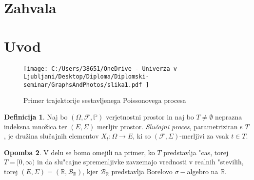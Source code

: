 \documentclass[12pt, a4paper, reqno]{amsart}
\theoremstyle{definition}
\newtheorem{definicija}{Definicija}[section]
\newtheorem{opomba}[definicija]{Opomba}
\theoremstyle{plain}
\newcommand{\R}{\mathbb{R}}
\newcommand{\B}{\mathcal{B}}
\newcommand{\1}{\mathds{1}}
\begin{document}
\section*{Zahvala}
%
\pagebreak

\section{Uvod}

    \begin{center}
    \end{center}

    \begin{figure}[H]
        \centering
        \texttt{[image: 
            C:/Users/38651/OneDrive - Univerza v Ljubljani/Desktop/Diploma/Diplomski-seminar/GraphsAndPhotos/slika1.pdf
            ]}
        \caption{Primer trajektorije sestavljenega Poissonovega procesa}
        \label{fig:slika1}
    \end{figure}
    
    \noindent


    \begin{definicija}
        Naj bo $(\Omega, \mathcal{F}, \mathbb{P})$ verjetnostni prostor in naj bo $T\neq\emptyset$
        neprazna indeksna množica ter $(E, \Sigma)$ merljiv prostor. \textit{Slučajni proces}, 
        parametriziran s $T$, je družina slučajnih elementov $X_t : \Omega \to E$,
         ki so $(\mathcal{F}, \Sigma)$-merljivi za vsak $t \in T$.
        \label{def:slucProc}
    \end{definicija}

    \begin{opomba}
        V delu se bomo omejili na primer, ko $T$ predstavlja "cas, torej $T = [0, \infty)$ in da slu"cajne
        spremenljivke 
        zavzemajo vrednosti v realnih "stevilih, torej $(E, \Sigma) = (\R, \B_{\R})$, kjer $\B_\R$ 
        predstavlja Borelovo $\sigma-$algebro na $\R$.
        \label{op:Konvencije}
    \end{opomba}
\end{document}
